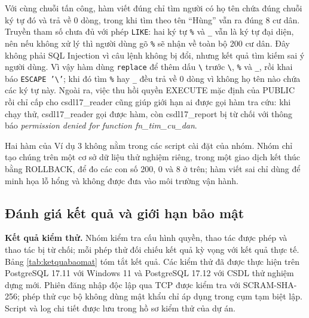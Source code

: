 Với cùng chuỗi tấn công, hàm viết đúng chỉ tìm người có họ tên chứa đúng chuỗi ký tự đó và trả về 0 dòng, trong khi tìm theo tên ``Hùng'' vẫn ra đúng 8 cư dân. Truyền tham số chưa đủ với phép \texttt{LIKE}: hai ký tự \texttt{\%} và \texttt{\_} vẫn là ký tự đại diện, nên nếu không xử lý thì người dùng gõ \texttt{\%} sẽ nhận về toàn bộ 200 cư dân. Đây không phải SQL Injection vì câu lệnh không bị đổi, nhưng kết quả tìm kiếm sai ý người dùng. Vì vậy hàm dùng \texttt{replace} để thêm dấu \texttt{\textbackslash} trước \texttt{\textbackslash}, \texttt{\%} và \texttt{\_}, rồi khai báo \texttt{ESCAPE '\textbackslash'}; khi đó tìm \texttt{\%} hay \texttt{\_} đều trả về 0 dòng vì không họ tên nào chứa các ký tự này. Ngoài ra, việc thu hồi quyền EXECUTE mặc định của PUBLIC rồi chỉ cấp cho csdl17\_reader cũng giúp giới hạn ai được gọi hàm tra cứu: khi chạy thử, csdl17\_reader gọi được hàm, còn csdl17\_report bị từ chối với thông báo \textit{permission denied for function fn\_tim\_cu\_dan}.

Hai hàm của Ví dụ 3 không nằm trong các script cài đặt của nhóm. Nhóm chỉ tạo chúng trên một cơ sở dữ liệu thử nghiệm riêng, trong một giao dịch kết thúc bằng ROLLBACK, để đo các con số 200, 0 và 8 ở trên; hàm viết sai chỉ dùng để minh họa lỗ hổng và không được đưa vào môi trường vận hành.

\subsection{Đánh giá kết quả và giới hạn bảo mật}
\label{subsec:danhgia}

\textbf{Kết quả kiểm thử.} Nhóm kiểm tra cấu hình quyền, thao tác được phép và thao tác bị từ chối; mỗi phép thử đối chiếu kết quả kỳ vọng với kết quả thực tế. Bảng \ref{tab:ketquabaomat} tóm tắt kết quả. Các kiểm thử đã được thực hiện trên PostgreSQL 17.11 với Windows 11 và PostgreSQL 17.12 với CSDL thử nghiệm dựng mới. Phiên đăng nhập độc lập qua TCP được kiểm tra với SCRAM-SHA-256; phép thử cục bộ không dùng mật khẩu chỉ áp dụng trong cụm tạm biệt lập. Script và log chi tiết được lưu trong hồ sơ kiểm thử của dự án.

